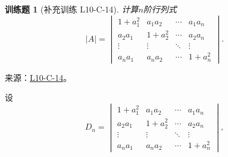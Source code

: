 \documentclass[UTF8,12pt,a4paper,fontset=fandol]{ctexart}
\newtheorem{exercise}{训练题}[section]
\begin{document}
\begin{exercise}[补充训练 L10-C-14]\label{prob:L10-C-14}
计算$n$阶行列式
        \[|A|=\begin{vmatrix}
                1+a_1^2 & a_1a_2  & \cdots & a_1a_n  \\
                a_2a_1  & 1+a_2^2 & \cdots & a_2a_n  \\
                \vdots  & \vdots  & \ddots & \vdots  \\
                a_na_1  & a_na_2  & \cdots & 1+a_n^2
            \end{vmatrix}.\]
\end{exercise}
\noindent 来源：\href{https://github.com/yhwu-is/Linear-Algebra-Left-Undone/blob/new/%E8%AE%B2%E4%B9%89/%E4%B8%93%E9%A2%98/10%20%E8%A1%8C%E5%88%97%E5%BC%8F.tex}{L10-C-14}。
\begin{solve}
设
            \[
                D_n = \begin{vmatrix}
                    1+a_1^2 & a_1a_2  & \cdots & a_1a_n  \\
                    a_2a_1  & 1+a_2^2 & \cdots & a_2a_n  \\
                    \vdots  & \vdots  & \ddots & \vdots  \\
                    a_na_1  & a_na_2  & \cdots & 1+a_n^2
                \end{vmatrix},
            \]


\end{solve}
\end{document}
